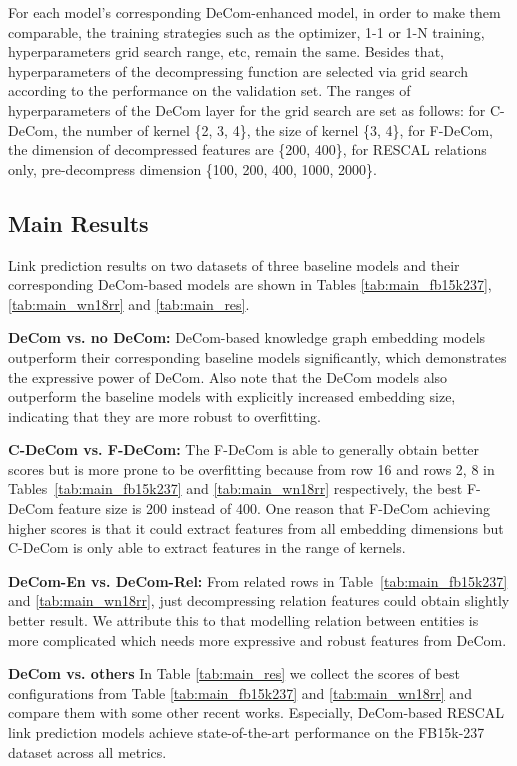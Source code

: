 \documentclass[letterpaper]{article} \usepackage{aaai20}  \usepackage{times}  \usepackage{helvet} \usepackage{courier}  \usepackage{booktabs}
\begin{document}
For each model's corresponding DeCom-enhanced model, in order to make them comparable, the training strategies such as the optimizer, 1-1 or 1-N training, hyperparameters grid search range, etc, remain the same. Besides that, hyperparameters of the decompressing function are selected via grid search according to the performance on the validation set. The ranges of hyperparameters of the DeCom layer for the grid search are
set as follows: for C-DeCom, the number of kernel \{2, 3, 4\}, the size of kernel \{3, 4\}, for F-DeCom, the dimension of decompressed features are \{200, 400\}, for RESCAL relations only, pre-decompress dimension  \{100, 200, 400, 1000, 2000\}. 

 

\subsection{Main Results}
Link prediction results on two datasets of three baseline models and their corresponding DeCom-based models are shown in Tables \ref{tab:main_fb15k237}, \ref{tab:main_wn18rr} and \ref{tab:main_res}. 

\textbf{DeCom vs. no DeCom:} DeCom-based knowledge graph embedding models outperform their corresponding baseline models significantly, which demonstrates the expressive power of DeCom. Also note that the DeCom models also outperform the baseline models with explicitly increased embedding size, indicating that they are more robust to overfitting.

\textbf{C-DeCom vs. F-DeCom:} The F-DeCom is able to generally obtain better scores but is more prone to be overfitting because from row 16 and rows 2, 8 in Tables~\ref{tab:main_fb15k237} and \ref{tab:main_wn18rr} respectively, the best F-DeCom feature size is 200 instead of 400. One reason that F-DeCom achieving higher scores is that it could extract features from all embedding dimensions but C-DeCom is only able to extract features in the range of kernels.


\textbf{DeCom-En vs. DeCom-Rel:} From related rows in Table~\ref{tab:main_fb15k237} and \ref{tab:main_wn18rr}, just decompressing relation features could obtain slightly better result. We attribute this to that modelling relation between entities is more complicated which needs more expressive and robust features from DeCom.

\textbf{DeCom vs. others} In Table \ref{tab:main_res} we collect the scores of best configurations from Table \ref{tab:main_fb15k237} and \ref{tab:main_wn18rr} and compare them with some other recent works. Especially, DeCom-based RESCAL link prediction models achieve state-of-the-art performance on the FB15k-237 dataset across all metrics.
\end{document}
